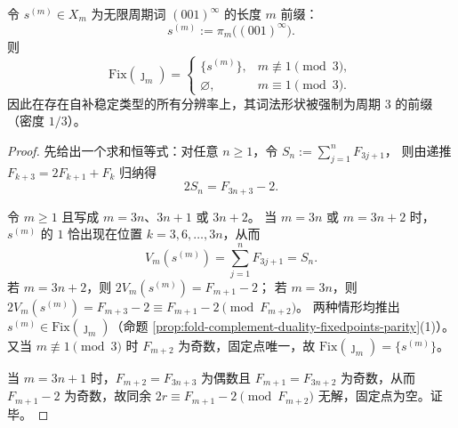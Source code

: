 \begin{theorem}\label{thm:fold-complement-fixed-word-period3}
令 \(s^{(m)}\in X_m\) 为无限周期词 \((001)^\infty\) 的长度 \(m\) 前缀：
\[
s^{(m)}:=\pi_m\bigl((001)^\infty\bigr).
\]
则
\[
\mathrm{Fix}(\jmath_m)=
\begin{cases}
\{s^{(m)}\}, & m\not\equiv 1\pmod 3,\\[2pt]
\varnothing, & m\equiv 1\pmod 3.
\end{cases}
\]
因此在存在自补稳定类型的所有分辨率上，其词法形状被强制为周期 \(3\) 的前缀（密度 \(1/3\)）。
\end{theorem}
\begin{proof}
先给出一个求和恒等式：对任意 \(n\ge 1\)，令
\(
S_n:=\sum_{j=1}^{n}F_{3j+1}
\)，
则由递推 \(F_{k+3}=2F_{k+1}+F_k\) 归纳得
\[
2S_n=F_{3n+3}-2.
\]
\par
令 \(m\ge 1\) 且写成 \(m=3n\)、\(3n+1\) 或 \(3n+2\)。
当 \(m=3n\) 或 \(m=3n+2\) 时，\(s^{(m)}\) 的 \(1\) 恰出现在位置 \(k=3,6,\dots,3n\)，从而
\[
V_m(s^{(m)})=\sum_{j=1}^{n}F_{3j+1}=S_n.
\]
若 \(m=3n+2\)，则 \(2V_m(s^{(m)})=F_{m+1}-2\)；
若 \(m=3n\)，则 \(2V_m(s^{(m)})=F_{m+3}-2\equiv F_{m+1}-2\pmod{F_{m+2}}\)。
两种情形均推出 \(s^{(m)}\in \mathrm{Fix}(\jmath_m)\)（命题 \ref{prop:fold-complement-duality-fixedpoints-parity}(1)）。
又当 \(m\not\equiv 1\pmod 3\) 时 \(F_{m+2}\) 为奇数，固定点唯一，故 \(\mathrm{Fix}(\jmath_m)=\{s^{(m)}\}\)。
\par
当 \(m=3n+1\) 时，\(F_{m+2}=F_{3n+3}\) 为偶数且 \(F_{m+1}=F_{3n+2}\) 为奇数，从而 \(F_{m+1}-2\) 为奇数，故同余 \(2r\equiv F_{m+1}-2\pmod{F_{m+2}}\) 无解，固定点为空。证毕。
\end{proof}

\endinput

